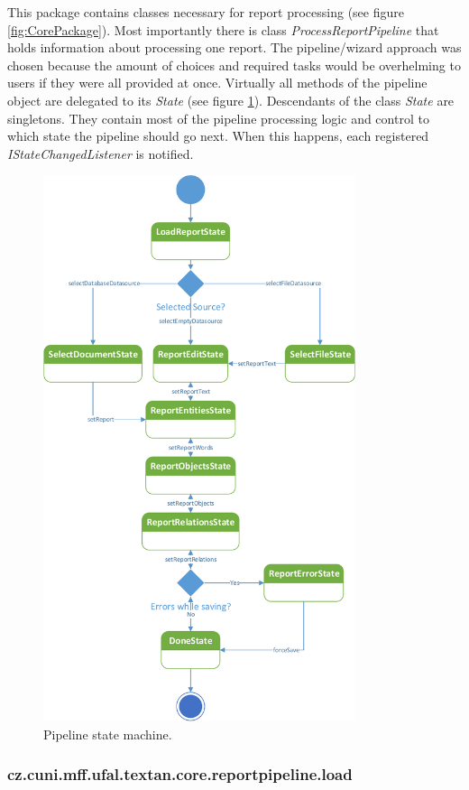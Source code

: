 This package contains classes necessary for report processing (see figure
\ref{fig:CorePackage}). Most importantly there is class
\emph{ProcessReportPipeline} that holds information about processing one report.
The pipeline/wizard approach was chosen because the amount of choices and
required tasks would be overhelming to users if they were all provided at once.
Virtually all methods of the pipeline object are delegated to its \emph{State}
(see figure \ref{fig:Pipeline}). Descendants of the class \emph{State} are
singletons. They contain most of the pipeline processing logic and control to
which state the pipeline should go next. When this happens, each registered
\emph{IStateChangedListener} is notified.

\begin{figure}[!htb]
        \centering
        \includegraphics[height=16cm]{Images/Pipeline}
        \caption{Pipeline state machine.}
        \label{fig:Pipeline}
\end{figure}

\subsubsection{cz.cuni.mff.ufal.textan.core.reportpipeline.load}

